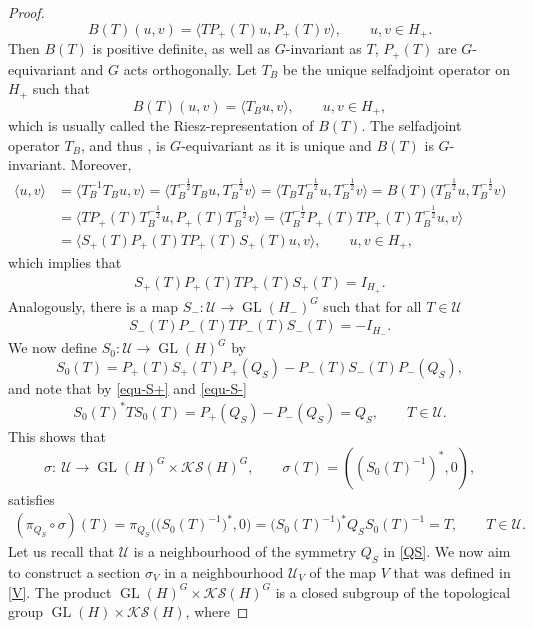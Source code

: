 \documentclass[pdftex]{sigma}
\numberwithin{equation}{section}
\theoremstyle{definition}
\DeclareMathOperator{\GL}{GL}
\begin{document}
\begin{proof}
\[B(T)(u,v)=\langle TP_+(T)u,P_+(T)v\rangle,\qquad u,v\in H_+.\]
Then $B(T)$ is positive definite, as well as $G$-invariant as $T$, $P_+(T)$ are $G$-equivariant and $G$ acts orthogonally. Let $T_B$ be the unique selfadjoint operator on $H_+$ such that
\[B(T)(u,v)=\langle T_Bu,v\rangle,\qquad u,v\in H_+,\]
which is usually called the Riesz-representation of $B(T)$. The selfadjoint operator $T_B$, and thus , is $G$\nobreakdash-equiv\-ari\-ant as it is unique and $B(T)$ is $G$-invariant. Moreover,
\begin{align*}
\langle u,v\rangle&=\bigl\langle T_B^{-1}T_Bu,v\bigr\rangle=\bigl\langle T_B^{-\frac{1}{2}}T_Bu,T_B^{-\frac{1}{2}}v\bigr\rangle=\bigl\langle T_BT_B^{-\frac{1}{2}}u,T_B^{-\frac{1}{2}}v\bigr\rangle=B(T)\bigl(T_B^{-\frac{1}{2}}u,T_B^{-\frac{1}{2}}v\bigr)\\
&=\bigl\langle TP_+(T)T_B^{-\frac{1}{2}}u,P_+(T)T_B^{-\frac{1}{2}}v\bigr\rangle=\bigl\langle T_B^{-\frac{1}{2}}P_+(T)TP_+(T)T_B^{-\frac{1}{2}}u,v\bigr\rangle\\
&=\langle S_+(T)P_+(T)TP_+(T)S_+(T)u,v\rangle,\qquad u,v\in H_+,
\end{align*}
which implies that
\begin{align}\label{equ-S+}
S_+(T)P_+(T)TP_+(T)S_+(T)=I_{H_+}.
\end{align}
Analogously, there is a map $S_- \colon \mathcal{U}\rightarrow\GL(H_-)^G$ such that for all $T\in\mathcal{U}$
\begin{align}\label{equ-S-}
S_-(T)P_-(T) TP_-(T)S_-(T)=-I_{H_-}.
\end{align}
We now define $S_0 \colon \mathcal{U}\rightarrow\GL(H)^G$ by
\[S_0(T)=P_+(T)S_+(T)P_+(Q_S)-P_-(T)S_-(T)P_-(Q_S),\]
and note that by \eqref{equ-S+} and \eqref{equ-S-}
\begin{align*}
S_0(T)^\ast TS_0(T)=P_+(Q_S)-P_-(Q_S)=Q_S,\qquad T\in\mathcal{U}.
\end{align*}
This shows that
\[\sigma \colon \ \mathcal{U}\rightarrow\GL(H)^G\times\mathcal{KS}(H)^G,\qquad \sigma(T)=((S_0(T)^{-1})^\ast,0),\]
satisfies
\begin{align}\label{equ-picircsigma}
(\pi_{Q_S}\circ\sigma)(T)=\pi_{Q_S}\bigl(\bigl(S_0(T)^{-1}\bigr)^\ast,0\bigr)=\bigl(S_0(T)^{-1}\bigr)^\ast Q_S S_0(T)^{-1}=T,\qquad T\in\mathcal{U}.
\end{align}
Let us recall that $\mathcal{U}$ is a neighbourhood of the symmetry $Q_S$ in \eqref{QS}. We now aim to construct a section $\sigma_V$ in a neighbourhood $\mathcal{U}_V$ of the map $V$ that was defined in \eqref{V}. The product $\GL(H)^G\times\mathcal{KS}(H)^G$ is a closed subgroup of the topological group $\GL(H)\times\mathcal{KS}(H)$, where

\end{proof}
\end{document}
